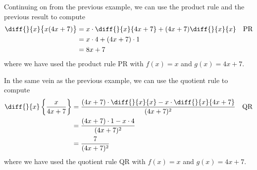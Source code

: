 \begin{eg}\label{eg:DIFFsimpleToolsAB}
Continuing on from the previous example, we can use the product rule
and the previous result to compute
  \begin{align*}
  \diff{}{x} \big\{ x ( 4x + 7) \big\}
  &= x \cdot \diff{}{x} \{ 4x + 7 \} + (4x+7) \diff{}{x} \{ x \} &
\text{PR} \\
  &= x \cdot 4 + (4x+7) \cdot 1 \\
  &= 8x+7
\end{align*}
where we have used the product rule PR with $f(x) =x$ and $g(x)=4x+7$.
\end{eg}
\begin{eg}\label{eg:DIFFsimpleToolsAB2}
In the same vein as the previous example, we can use the quotient rule to compute
  \begin{align*}
  \diff{}{x} \left\{ \frac{x}{4x + 7} \right \}
  &= \frac{ (4x+7) \cdot \diff{}{x} \{x\}  - x \cdot \diff{}{x} \{ 4x + 7 \} }{(4x+7)^2}
& \text{QR}  \\
  &= \frac{ (4x+7) \cdot 1  - x \cdot 4 }{(4x+7)^2}  \\
&= \frac{7}{(4x+7)^2}
\end{align*}
where we have used the quotient rule QR with $f(x) =x$ and $g(x)=4x+7$.
\end{eg}


